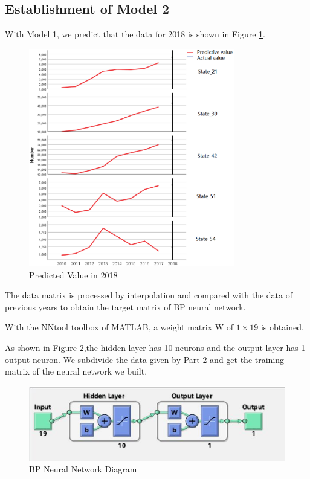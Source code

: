\documentclass[12pt]{mcmthesis}
\begin{document}
\subsection{Establishment of Model 2}
With Model 1, we predict that the data for 2018 is shown in Figure \ref{2018}.
\begin{figure}
  \centering
\includegraphics[width=0.8\textwidth]{figures/111.eps}
  \caption{Predicted Value in 2018}\label{2018}
\end{figure}\par
The data matrix is processed by interpolation and compared with the data of previous years to obtain the target matrix of BP neural network.\par
With the NNtool toolbox of MATLAB, a weight matrix W of $1\times 19$ is obtained.\par
As shown in Figure \ref{BPnn},the hidden layer has 10 neurons and the output layer has 1 output neuron. We subdivide the data given by Part 2 and get the training matrix of the neural network we built.\par
\begin{figure}[htbp]
  \centering
  \includegraphics[width=\textwidth]{figures/nn.eps}
  \caption{BP Neural Network Diagram}\label{BPnn}
\end{figure}
\end{document}
